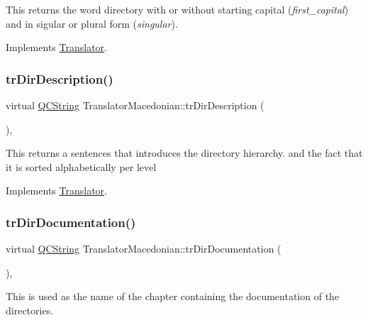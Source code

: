 This returns the word directory with or without starting capital ({\itshape first\+\_\+capital}) and in sigular or plural form ({\itshape singular}). 

Implements \mbox{\hyperlink{class_translator}{Translator}}.

\mbox{\label{class_translator_macedonian_a305dc44e06fdf716dbe46c369b5a82fc}} 
\subsubsection{\texorpdfstring{trDirDescription()}{trDirDescription()}}
{\footnotesize\ttfamily virtual \mbox{\hyperlink{class_q_c_string}{Q\+C\+String}} Translator\+Macedonian\+::tr\+Dir\+Description (\begin{DoxyParamCaption}{ }\end{DoxyParamCaption})\hspace{0.3cm}{\ttfamily [inline]}, {\ttfamily [virtual]}}

This returns a sentences that introduces the directory hierarchy. and the fact that it is sorted alphabetically per level 

Implements \mbox{\hyperlink{class_translator}{Translator}}.

\mbox{\label{class_translator_macedonian_a77e2f657f5b10b6a92984cd48976c9ed}} 
\subsubsection{\texorpdfstring{trDirDocumentation()}{trDirDocumentation()}}
{\footnotesize\ttfamily virtual \mbox{\hyperlink{class_q_c_string}{Q\+C\+String}} Translator\+Macedonian\+::tr\+Dir\+Documentation (\begin{DoxyParamCaption}{ }\end{DoxyParamCaption})\hspace{0.3cm}{\ttfamily [inline]}, {\ttfamily [virtual]}}

This is used as the name of the chapter containing the documentation of the directories. 

